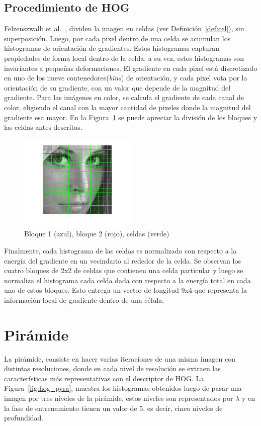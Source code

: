 \subsection{Procedimiento de HOG}
Felzenszwalb et al.~\cite{Felzenszwalb2010}, dividen la imagen en celdas (ver Definición~\ref{def:cel}), sin superposición. Luego, por cada pixel dentro de una celda se acumulan los histogramas de orientación de gradientes. Estos histogramas capturan propiedades de forma local dentro de la celda. a su vez, estos histogramas son invariantes a pequeñas deformaciones.
El gradiente en cada pixel está discretizado en uno de los nueve contenedores(\textit{bins}) de orientación, y cada pixel vota por la orientación de su gradiente, con un valor que depende de la magnitud del gradiente. Para las imágenes en color, se calcula el gradiente de cada canal de color, eligiendo el canal con la mayor cantidad de pixeles donde la magnitud del gradiente esa mayor. En la Figura~\ref{fig:blocks_cells} se puede apreciar la división de los bloques y las celdas antes descritas.

\begin{figure}[tb]
  \centering
   \includegraphics[width=0.5\textwidth]{Figuras/lena-grid.png}
   \caption{Bloque 1 (azul), bloque 2 (rojo), celdas (verde)}
   \label{fig:blocks_cells}
\end{figure}

Finalmente, cada histograma de las celdas es normalizado con respecto a la energía del gradiente en un vecindario al rededor de la celda. Se observan los cuatro bloques de 2x2 de celdas que contienen una celda particular y luego se normaliza el histograma cada celda dada con respecto a la energía total en cada uno de estos bloques. Esto entrega un vector de longitud 9x4 que representa la información local de gradiente dentro de una célula.
\section{Pirámide}\label{sec:pyra}
La pirámide, consiste en hacer varias iteraciones de una misma imagen con distintas resoluciones, donde en cada nivel de resolución se extraen las características más representativas con el descriptor de HOG. La Figura~\ref{fig:hog_pyra}, muestra los histogramas obtenidos luego de pasar una imagen por tres niveles de la pirámide, estos niveles son representados por $\lambda$ y en la fase de entrenamiento tienen un valor de 5, es decir, cinco niveles de profundidad.


